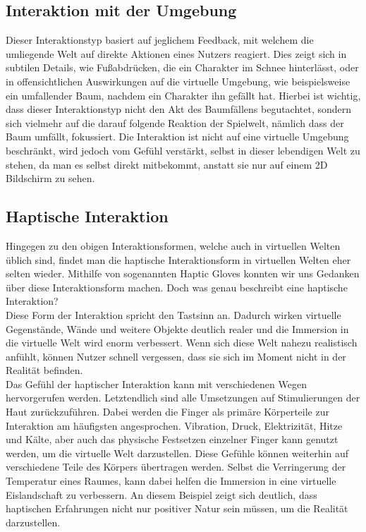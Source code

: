 
\subsection{Interaktion mit der Umgebung}
Dieser Interaktionstyp basiert auf jeglichem Feedback, mit welchem die umliegende Welt auf direkte Aktionen eines Nutzers reagiert. Dies zeigt sich in subtilen Details, wie Fußabdrücken, die ein Charakter im Schnee hinterlässt, oder in offensichtlichen Auswirkungen auf die virtuelle Umgebung, wie beispielsweise ein umfallender Baum, nachdem ein Charakter ihn gefällt hat. Hierbei ist wichtig, dass dieser Interaktionstyp nicht den Akt des Baumfällens begutachtet, sondern sich vielmehr auf die darauf folgende Reaktion der Spielwelt, nämlich dass der Baum umfällt, fokussiert. Die Interaktion ist nicht auf eine virtuelle Umgebung beschränkt, wird jedoch vom Gefühl verstärkt, selbst in dieser lebendigen Welt zu stehen, da man es selbst direkt mitbekommt, anstatt sie nur auf einem 2D Bildschirm zu sehen.

\newpage
\noindent
\subsection{Haptische Interaktion}
Hingegen zu den obigen Interaktionsformen, welche auch in virtuellen Welten üblich sind, findet man die haptische Interaktionsform in virtuellen Welten eher selten wieder. Mithilfe von sogenannten Haptic Gloves konnten wir uns Gedanken über diese Interaktionsform machen. Doch was genau beschreibt eine haptische Interaktion?\\
Diese Form der Interaktion spricht den Tastsinn an. Dadurch wirken virtuelle Gegenstände, Wände und weitere Objekte deutlich realer und die Immersion in die virtuelle Welt wird enorm verbessert. Wenn sich diese Welt nahezu realistisch anfühlt, können Nutzer schnell vergessen, dass sie sich im Moment nicht in der Realität befinden.\\
Das Gefühl der haptischer Interaktion kann mit verschiedenen Wegen hervorgerufen werden. Letztendlich sind alle Umsetzungen auf Stimulierungen der Haut zurückzuführen. Dabei werden die Finger als primäre Körperteile zur Interaktion am häufigsten angesprochen. Vibration, Druck, Elektrizität, Hitze und Kälte, aber auch das physische Festsetzen einzelner Finger kann genutzt werden, um die virtuelle Welt darzustellen. Diese Gefühle können weiterhin auf verschiedene Teile des Körpers übertragen werden. Selbst die Verringerung der Temperatur eines Raumes, kann dabei helfen die Immersion in eine virtuelle Eislandschaft zu verbessern. An diesem Beispiel zeigt sich deutlich, dass haptischen Erfahrungen nicht nur positiver Natur sein müssen, um die Realität darzustellen.

